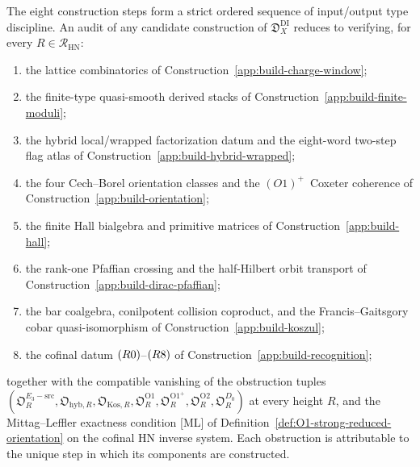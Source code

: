The eight construction steps form a strict ordered sequence of
input/output type discipline.  An audit of any candidate construction of
\(\mathfrak D_X^{\mathrm{DI}}\) reduces to verifying, for every
\(R\in\mathcal R_{\mathrm{HN}}\):
\begin{enumerate}
\item the lattice combinatorics of
Construction~\ref{app:build-charge-window};
\item the finite-type quasi-smooth derived stacks of
Construction~\ref{app:build-finite-moduli};
\item the hybrid local/wrapped factorization datum and the eight-word
two-step flag atlas of Construction~\ref{app:build-hybrid-wrapped};
\item the four Cech--Borel orientation classes and the
\((O1)^+\)~Coxeter coherence of
Construction~\ref{app:build-orientation};
\item the finite Hall bialgebra and primitive matrices of
Construction~\ref{app:build-hall};
\item the rank-one Pfaffian crossing and the half-Hilbert orbit
transport of Construction~\ref{app:build-dirac-pfaffian};
\item the bar coalgebra, conilpotent collision coproduct, and the
Francis--Gaitsgory cobar quasi-isomorphism of
Construction~\ref{app:build-koszul};
\item the cofinal datum
\(\textup{(R0)}\)--\(\textup{(R8)}\) of
Construction~\ref{app:build-recognition};
\end{enumerate}
together with the compatible vanishing of the obstruction tuples
\((\mathfrak O^{E_3-\mathrm{src}}_R,
\mathfrak O_{\mathrm{hyb},R},
\mathfrak O_{\mathrm{Kos},R},
\mathfrak O^{\mathrm{O1}}_R,
\mathfrak O^{\mathrm{O1}^+}_R,
\mathfrak O^{\mathrm{O2}}_R,
\mathfrak O_R^{D_0})\) at every height \(R\), and the
Mittag--Leffler exactness condition \textup{[ML]} of
Definition~\ref{def:O1-strong-reduced-orientation} on the cofinal HN inverse
system.  Each obstruction is attributable to the unique step
in which its components are constructed.

